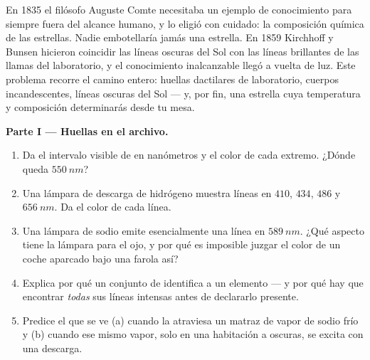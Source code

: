 \begin{problem}
\label{pb:g10:light-spectra:1}
En 1835 el filósofo Auguste Comte necesitaba un ejemplo de conocimiento
para siempre fuera del alcance humano, y lo eligió con cuidado: la
composición química de las estrellas. Nadie embotellaría jamás una
estrella. En 1859 Kirchhoff y Bunsen hicieron coincidir las líneas
oscuras del Sol con las líneas brillantes de las llamas del laboratorio,
y el conocimiento inalcanzable llegó a vuelta de luz. Este problema
recorre el camino entero: huellas dactilares de laboratorio, cuerpos
incandescentes, líneas oscuras del Sol --- y, por fin, una estrella cuya
temperatura y composición determinarás desde tu mesa.

\medskip
\noindent\textbf{Parte I --- Huellas en el archivo.}
\begin{enumerate}
  \item Da el intervalo visible de  en nanómetros y el
        color de cada extremo. ¿Dónde queda $\qty{550}{nm}$?
  \item Una lámpara de descarga de hidrógeno muestra líneas en $410$,
        $434$, $486$ y $\qty{656}{nm}$. Da el color de cada línea.
  \item Una lámpara de sodio emite esencialmente una línea en
        $\qty{589}{nm}$. ¿Qué aspecto tiene la lámpara para el ojo, y
        por qué es imposible juzgar el color de un coche aparcado bajo
        una farola así?
  \item Explica por qué un conjunto de  identifica a
        un elemento --- y por qué hay que encontrar \emph{todas} sus
        líneas intensas antes de declararlo presente.
  \item Predice el  que se ve (a) cuando la  atraviesa
        un matraz de vapor de sodio frío y (b) cuando ese mismo vapor,
        solo en una habitación a oscuras, se excita con una descarga.
\end{enumerate}


\end{problem}
